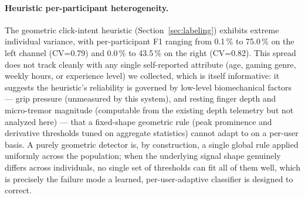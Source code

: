 \paragraph{Heuristic per-participant heterogeneity.}
The geometric click-intent heuristic (Section~\ref{sec:labeling}) exhibits extreme
individual variance, with per-participant F1 ranging from 0.1\,\% to 75.0\,\% on the
left channel (CV=0.79) and 0.0\,\% to 43.5\,\% on the right (CV=0.82). This spread does
not track cleanly with any single self-reported attribute (age, gaming genre, weekly
hours, or experience level) we collected, which is itself informative: it suggests the
heuristic's reliability is governed by low-level biomechanical factors ---
grip pressure (unmeasured by this system), and resting finger depth and
micro-tremor magnitude (computable from the existing depth telemetry but not
analyzed here) --- that a fixed-shape
geometric rule (peak prominence and derivative thresholds tuned on aggregate statistics)
cannot adapt to on a per-user basis. A purely geometric detector is, by construction,
a single global rule applied uniformly across the population; when the underlying
signal shape genuinely differs across individuals, no single set of thresholds can fit
all of them well, which is precisely the failure mode a learned, per-user-adaptive
classifier is designed to correct.

